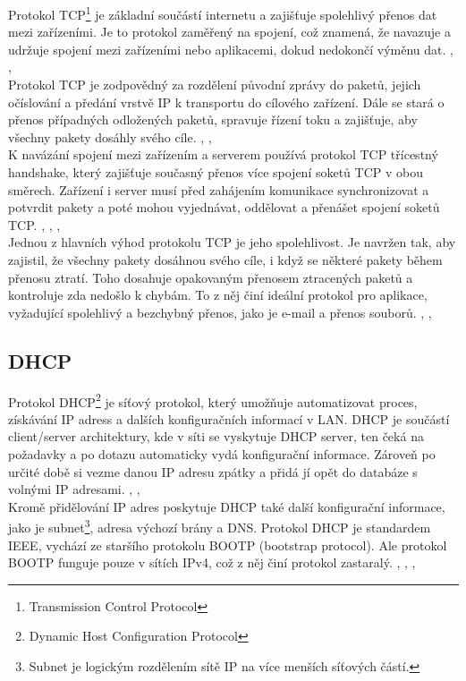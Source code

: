 \documentclass[12pt]{report}			%
\begin{document}
				
Protokol TCP\footnote{Transmission Control Protocol} je základní součástí internetu a zajišťuje spolehlivý přenos dat mezi zařízeními. Je to protokol zaměřený na spojení, což znamená, že navazuje a udržuje spojení mezi zařízeními nebo aplikacemi, dokud nedokončí výměnu dat. \cite{Pruvodce}, \cite{TCP}, \cite{TCP1}
\\
Protokol TCP je zodpovědný za rozdělení původní zprávy do paketů, jejich očíslování a předání vrstvě IP k transportu do cílového zařízení. Dále se stará o přenos případných odložených paketů, spravuje řízení toku a zajišťuje, aby všechny pakety dosáhly svého cíle.  \cite{Pruvodce}, \cite{TCP}, \cite{TCP1}
\\
K navázání spojení mezi zařízením a serverem používá protokol TCP třícestný handshake, který zajišťuje současný přenos více spojení soketů TCP v obou směrech. Zařízení i server musí před zahájením komunikace synchronizovat a potvrdit pakety a poté mohou vyjednávat, oddělovat a přenášet spojení soketů TCP. \cite{Pruvodce}, \cite{TCP}, \cite{TCP1}, \cite{TCP2}
\\
Jednou z hlavních výhod protokolu TCP je jeho spolehlivost. Je navržen tak, aby zajistil, že všechny pakety dosáhnou svého cíle, i když se některé pakety během přenosu ztratí. Toho dosahuje opakovaným přenosem ztracených paketů a kontroluje zda nedošlo k chybám. To z něj činí ideální protokol pro aplikace, vyžadující spolehlivý a bezchybný přenos, jako je e-mail a přenos souborů. \cite{Pruvodce}, \cite{TCP}, \cite{TCP1}



				\subsection{DHCP}
				
				
Protokol DHCP\footnote{Dynamic Host Configuration Protocol} je síťový protokol, který umožňuje automatizovat proces, získávání IP adress a dalších konfiguračních informací v LAN. DHCP je součástí client/server architektury, kde v síti se vyskytuje DHCP server, ten čeká na požadavky a po dotazu automaticky vydá konfigurační informace. Zároveň po určité době si vezme danou IP adresu zpátky a přidá jí opět do databáze s volnými IP adresami. \cite{DHCP1}, \cite{DHCP2}, \cite{DHCP4}
\\
Kromě přidělování IP adres poskytuje DHCP také další  konfigurační informace, jako je subnet\footnote{Subnet je logickým rozdělením sítě IP na více menších síťových částí.}, adresa výchozí brány a DNS. Protokol DHCP je standardem IEEE, vychází ze staršího protokolu BOOTP (bootstrap protocol). Ale protokol BOOTP funguje pouze v sítích IPv4, což z něj činí protokol zastaralý. \cite{DHCP1}, \cite{DHCP2}, \cite{DHCP3} ,\cite{DHCP4}
\end{document}
